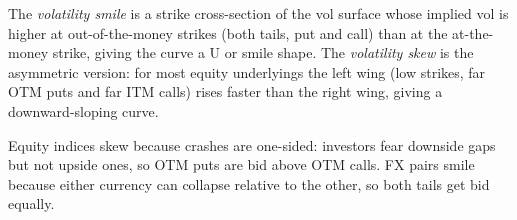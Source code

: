 \begin{definition}
\label{def:smile_skew}
The \emph{volatility smile} is a strike cross-section of the vol
surface whose implied vol is higher at out-of-the-money strikes
(both tails, put and call) than at the at-the-money strike, giving
the curve a U or smile shape. The \emph{volatility skew} is the
asymmetric version: for most equity underlyings the left wing
(low strikes, far OTM puts and far ITM calls) rises faster than
the right wing, giving a downward-sloping curve.
\end{definition}

Equity indices skew because crashes are one-sided: investors fear
downside gaps but not upside ones, so OTM puts are bid above OTM
calls. FX pairs smile because either currency can collapse
relative to the other, so both tails get bid equally.

